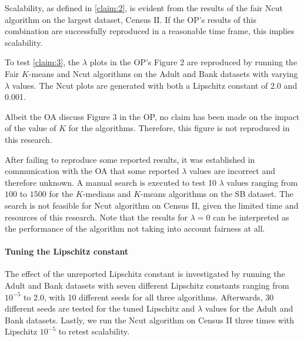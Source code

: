 Scalability, as defined in \ref{claim:2}, is evident from the results of the fair Ncut algorithm on the largest dataset, Census II. If the OP's results of this combination are successfully reproduced in a reasonable time frame, this implies scalability.

To test \ref{claim:3}, the $\lambda$ plots in the OP's Figure 2 are reproduced by running the Fair $K$-means and Ncut algorithms on the Adult and Bank datasets with varying $\lambda$ values. The Ncut plots are generated with both a Lipschitz constant of 2.0 and 0.001.

Albeit the OA discuss Figure 3 in the OP, no claim has been made on the impact of the value of $K$ for the algorithms. Therefore, this figure is not reproduced in this research.

After failing to reproduce some reported results, it was established in communication with the OA that some reported $\lambda$ values are incorrect and therefore unknown. A manual search is executed to test 10 $\lambda$ values ranging from $100$ to $1500$ for the $K$-medians and $K$-means algorithms on the SB dataset. The search is not feasible for Ncut algorithm on Census II, given the limited time and resources of this research. Note that the results for $\lambda = 0$ can be interpreted as the performance of the algorithm not taking into account fairness at all. 

\paragraph{Tuning the Lipschitz constant}
The effect of the unreported Lipschitz constant is investigated by running the Adult and Bank datasets with seven different Lipschitz constants ranging from $10^{-5}$ to $2.0$, with 10 different seeds for all three algorithms. Afterwards, 30 different seeds are tested for the tuned Lipschitz and $\lambda$ values for the Adult and Bank datasets. Lastly,  we run the Ncut algorithm on Census II three times with Lipschitz $10^{-5}$ to retest scalability.

